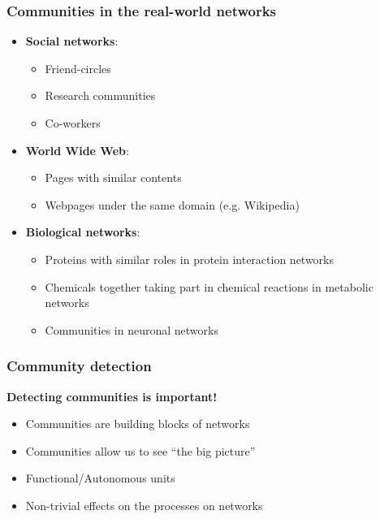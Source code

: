 \documentclass{beamer}
\begin{document}
\begin{frame}
    \frametitle{Communities in the real-world networks}
    \centering
    \begin{itemize}
    \setlength\itemsep{1em}
        \item{{\bf Social networks}: 
            \begin{itemize}
                \item{Friend-circles}
                \item{Research communities}
                \item{Co-workers}
            \end{itemize}
    }
        \item{{\bf World Wide Web}: 
            \begin{itemize}
                \item{Pages with similar contents}
                \item{Webpages under the same domain (e.g. Wikipedia)}
            \end{itemize}
    }
        \item{{\bf Biological networks}:
            \begin{itemize}
                \item{Proteins with similar roles in protein interaction networks}
                \item{Chemicals together taking part in chemical reactions in metabolic networks}
                \item{Communities in neuronal networks}
            \end{itemize}
}
    \end{itemize}
\end{frame}
\begin{frame}
    \frametitle{Community detection}
    \centering
    
    {\bf Detecting communities is important!}
    \vspace{2em}
    \begin{itemize}
    \setlength\itemsep{1em}
        \item{Communities are building blocks of networks}
        \item{Communities allow us to see ``the big picture''}
        \item{Functional/Autonomous units}
        \item{Non-trivial effects on the processes on networks}
    \end{itemize}
\end{frame}
\end{document}
